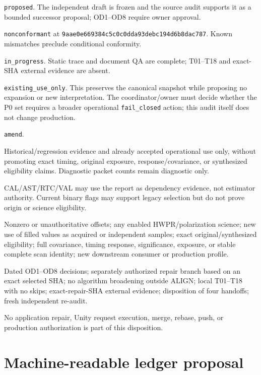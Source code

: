 \documentclass[11pt]{article}
\newcommand{\code}[1]{\nolinkurl{#1}}
\newcommand{\AuditGoverningSHAPrint}{\code{9aae0e669384c5c0c0dd}\allowbreak\code{a93debc194d6b8dac787}}
\begin{document}
\begin{description}[style=nextline]
\item[Contract status] \texttt{proposed}.  The independent draft is frozen and
the source audit supports it as a bounded successor proposal; OD1--OD8 require
owner approval.
\item[Implementation status] \texttt{nonconformant} at
\AuditGoverningSHAPrint.  Known mismatches preclude conditional conformity.
\item[Validation status] \texttt{in\_progress}.  Static trace and document QA
are complete; T01--T18 and exact-SHA external evidence are absent.
\item[Production status] \texttt{existing\_use\_only}.  This preserves the
canonical snapshot while proposing no expansion or new interpretation.  The
coordinator/owner must decide whether the P0 set requires a broader operational
\texttt{fail\_closed} action; this audit itself does not change production.
\item[Verdict] \texttt{amend}.
\item[Allowed consumers] Historical/regression evidence and already accepted
operational use only, without promoting exact timing, original exposure,
response/covariance, or synthesized eligibility claims.  Diagnostic packet
counts remain diagnostic only.
\item[Restricted consumers] CAL/AST/RTC/VAL may use the report as dependency
evidence, not estimator authority.  Current binary flags may support legacy
selection but do not prove origin or science eligibility.
\item[Fail-closed claims] Nonzero or unauthoritative offsets; any
enabled HWPR/polarization science; new use of filled values as acquired or
independent samples; exact original/synthesized eligibility; full covariance,
timing response, significance, exposure, or stable complete scan identity;
new downstream consumer or production profile.
\item[Repair/re-audit trigger] Dated OD1--OD8 decisions; separately authorized
repair branch based on an exact selected SHA; no algorithm broadening outside
ALIGN; local T01--T18 with no skips; exact-repair-SHA external evidence;
disposition of four handoffs; fresh independent re-audit.
\end{description}

No application repair, Unity request execution, merge, rebase, push, or
production authorization is part of this disposition.

\section{Machine-readable ledger proposal}
\end{document}

